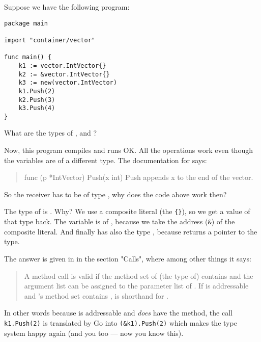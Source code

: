 \begin{Exercise}[title={Method calls},difficulty=8]
\label{ex:methodcalls}
\Question \label{ex:methodcalls q1} Suppose we have the following
program:
\begin{lstlisting}
package main

import "container/vector"

func main() {
	k1 := vector.IntVector{}
	k2 := &vector.IntVector{}
	k3 := new(vector.IntVector)
	k1.Push(2)
	k2.Push(3)
	k3.Push(4)
}
\end{lstlisting}
What are the types of ,  and ?

\Question Now, this program compiles and runs OK. All the 
operations work even though the variables are of a different type. The
documentation for  says:
\begin{quote}
func (p *IntVector) Push(x int)
Push appends x to the end of the vector.
\end{quote}
So the receiver has to be of type , why does the code
above work then?

\end{Exercise}

\begin{Answer}
\Question The type of  is . Why? We use 
a composite literal (the \verb|{}|), so we get a value of that type
back. The variable  is of , because we
take the address (\verb|&|) of the composite literal. And finally
 has also the type , because 
returns a pointer to the type.

\Question The answer is given in \cite{go_spec} in the section "Calls",
where among other things it says:
\begin{quote}
A method call  is valid if the method set of (the type of)
contains  and the argument list can be assigned to the parameter list
of . If  is addressable and 's method set
contains ,  is shorthand for .
\end{quote}
In other words because  is addressable and
 \emph{does} have the  method, the
call \lstinline{k1.Push(2)} is translated by Go into 
\lstinline{(&k1).Push(2)} which makes the type system happy again (and
you too --- now you know this).

\end{Answer}
